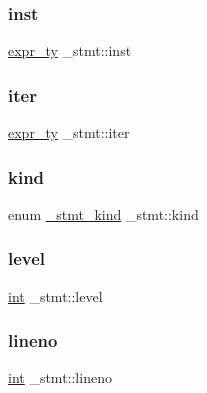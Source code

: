 \mbox{\label{struct__stmt_a7e058de69ac9cb2c466166a8e414fa0e}} 
\subsubsection{\texorpdfstring{inst}{inst}}
{\footnotesize\ttfamily \mbox{\hyperlink{_python-ast_8h_a56d3705e020a071405094a220c4592bd}{expr\+\_\+ty}} \+\_\+stmt\+::inst}

\mbox{\label{struct__stmt_a01937d69e8ba0212ddd700bd1ddf7d35}} 
\subsubsection{\texorpdfstring{iter}{iter}}
{\footnotesize\ttfamily \mbox{\hyperlink{_python-ast_8h_a56d3705e020a071405094a220c4592bd}{expr\+\_\+ty}} \+\_\+stmt\+::iter}

\mbox{\label{struct__stmt_a9074cf45fef325a5baa737d59102ec9a}} 
\subsubsection{\texorpdfstring{kind}{kind}}
{\footnotesize\ttfamily enum \mbox{\hyperlink{_python-ast_8h_a3f8747ef1343a8899c10bb4911deed50}{\+\_\+stmt\+\_\+kind}} \+\_\+stmt\+::kind}

\mbox{\label{struct__stmt_a2ff950f55dfd2b7e168973bd70bf1c04}} 
\subsubsection{\texorpdfstring{level}{level}}
{\footnotesize\ttfamily \mbox{\hyperlink{warnings_8h_a74f207b5aa4ba51c3a2ad59b219a423b}{int}} \+\_\+stmt\+::level}

\mbox{\label{struct__stmt_a80852961a5875977df5769033d8039d4}} 
\subsubsection{\texorpdfstring{lineno}{lineno}}
{\footnotesize\ttfamily \mbox{\hyperlink{warnings_8h_a74f207b5aa4ba51c3a2ad59b219a423b}{int}} \+\_\+stmt\+::lineno}

